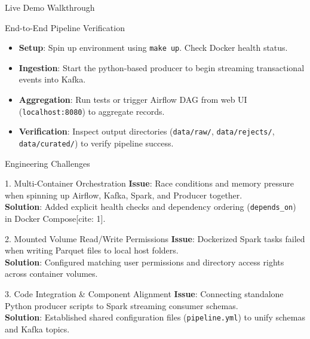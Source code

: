 \documentclass[10pt]{beamer}
\begin{document}
\begin{frame}{Live Demo Walkthrough}
  \begin{block}{End-to-End Pipeline Verification}
    \begin{itemize}
      \item \textbf{Setup}: Spin up environment using \texttt{make up}. Check Docker health status.
      \item \textbf{Ingestion}: Start the python-based producer to begin streaming transactional events into Kafka.
      \item \textbf{Aggregation}: Run tests or trigger Airflow DAG from web UI (\texttt{localhost:8080}) to aggregate records.
      \item \textbf{Verification}: Inspect output directories (\texttt{data/raw/}, \texttt{data/rejects/}, \texttt{data/curated/}) to verify pipeline success.
    \end{itemize}
  \end{block}
\end{frame}

\begin{frame}{Engineering Challenges}
  \small
  \begin{block}{1. Multi-Container Orchestration}
    \textbf{Issue}: Race conditions and memory pressure when spinning up Airflow, Kafka, Spark, and Producer together.\\
    \textbf{Solution}: Added explicit health checks and dependency ordering (\texttt{depends\_on}) in Docker Compose[cite: 1].
  \end{block}

  \begin{block}{2. Mounted Volume Read/Write Permissions}
    \textbf{Issue}: Dockerized Spark tasks failed when writing Parquet files to local host folders.\\
    \textbf{Solution}: Configured matching user permissions and directory access rights across container volumes.
  \end{block}

  \begin{block}{3. Code Integration & Component Alignment}
    \textbf{Issue}: Connecting standalone Python producer scripts to Spark streaming consumer schemas.\\
    \textbf{Solution}: Established shared configuration files (\texttt{pipeline.yml}) to unify schemas and Kafka topics.
  \end{block}
\end{frame}
\end{document}
